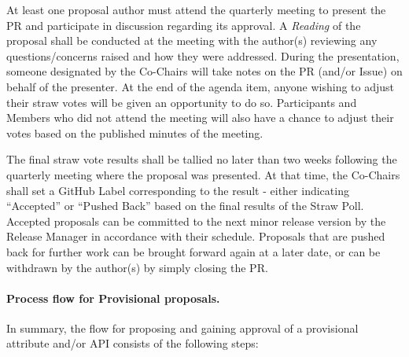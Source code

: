 \documentclass{article}
\begin{document}
At least one proposal author must attend the quarterly meeting to
present the PR and participate in discussion regarding its approval. A
\textit{Reading} of the proposal shall be conducted at the meeting with the
author(s) reviewing any questions/concerns raised and how they were
addressed. During the presentation, someone designated by the Co-Chairs
will take notes on the PR (and/or Issue) on behalf of the presenter. At
the end of the agenda item, anyone wishing to adjust their straw votes
will be given an opportunity to do so. Participants and Members who did
not attend the meeting will also have a chance to adjust their votes
based on the published minutes of the meeting.

The final straw vote results shall be tallied no later than two weeks
following the quarterly meeting where the proposal was presented. At
that time, the Co-Chairs shall set a GitHub Label corresponding to the
result - either indicating ``Accepted'' or ``Pushed Back'' based on the
final results of the Straw Poll. Accepted proposals can be
committed to the next minor release version by the Release Manager in
accordance with their schedule. Proposals that are pushed back for
further work can be brought forward again at a later date, or can be
withdrawn by the author(s) by simply closing the PR.

\hypertarget{process-flow-for-provisional-proposals}{%
\paragraph{Process flow for Provisional
proposals.}\label{process-flow-for-provisional-proposals}}

In summary, the flow for proposing and gaining approval of a provisional
attribute and/or API consists of the following steps:
\end{document}
